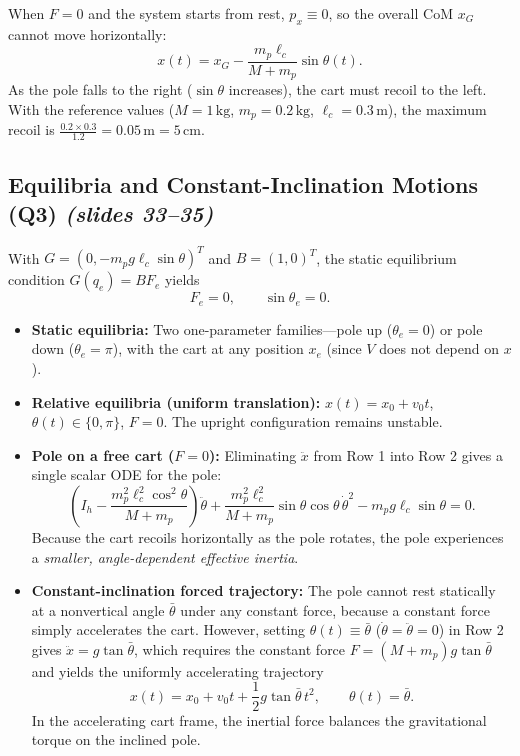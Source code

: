 \documentclass[11pt, a4paper]{article}
\theoremstyle{definition}
\theoremstyle{plain}
\begin{document}
\begin{intuition}
When $F = 0$ and the system starts from rest, $p_x \equiv 0$, so the overall CoM $x_G$ cannot move horizontally:
\[
  x(t) = x_G - \frac{m_p \ell_c}{M + m_p}\sin\theta(t).
\]
As the pole falls to the right ($\sin\theta$ increases), the cart must recoil to the left. With the reference values ($M=1\,\mathrm{kg}$, $m_p=0.2\,\mathrm{kg}$, $\ell_c=0.3\,\mathrm{m}$), the maximum recoil is $\frac{0.2 \times 0.3}{1.2} = 0.05\,\mathrm{m} = 5\,\mathrm{cm}$.
\end{intuition}

\subsection{Equilibria and Constant-Inclination Motions (Q3) \emph{(slides 33--35)}}

With $G = (0, -m_p g \ell_c \sin\theta)^T$ and $B = (1, 0)^T$, the static equilibrium condition $G(q_e) = B F_e$ yields
\[
  F_e = 0, \qquad \sin\theta_e = 0.
\]
\begin{itemize}
  \item \textbf{Static equilibria:} Two one-parameter families---pole up ($\theta_e = 0$) or pole down ($\theta_e = \pi$), with the cart at any position $x_e$ (since $V$ does not depend on $x$).
  \item \textbf{Relative equilibria (uniform translation):} $x(t) = x_0 + v_0 t$, $\theta(t) \in \{0, \pi\}$, $F = 0$. The upright configuration remains unstable.
  \item \textbf{Pole on a free cart ($F = 0$):} Eliminating $\ddot{x}$ from Row 1 into Row 2 gives a single scalar ODE for the pole:
  \[
    \left(I_h - \frac{m_p^2 \ell_c^2 \cos^2\theta}{M + m_p}\right)\ddot{\theta}
    + \frac{m_p^2 \ell_c^2}{M + m_p}\sin\theta\cos\theta\,\dot{\theta}^2
    - m_p g \ell_c \sin\theta = 0.
  \]
  Because the cart recoils horizontally as the pole rotates, the pole experiences a \emph{smaller, angle-dependent effective inertia}.
  \item \textbf{Constant-inclination forced trajectory:} The pole cannot rest statically at a nonvertical angle $\bar{\theta}$ under any constant force, because a constant force simply accelerates the cart. However, setting $\theta(t) \equiv \bar{\theta}$ ($\dot{\theta} = \ddot{\theta} = 0$) in Row 2 gives $\ddot{x} = g\tan\bar{\theta}$, which requires the constant force $F = (M + m_p)g\tan\bar{\theta}$ and yields the uniformly accelerating trajectory
  \[
    x(t) = x_0 + v_0 t + \frac{1}{2} g \tan\bar{\theta}\, t^2, \qquad \theta(t) = \bar{\theta}.
  \]
  In the accelerating cart frame, the inertial force balances the gravitational torque on the inclined pole.
\end{itemize}
\end{document}
